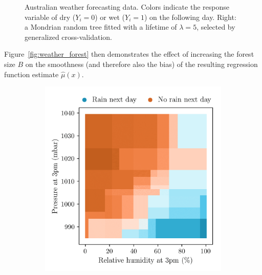 \begin{figure}[ht]
\begin{subfigure}{0.49\textwidth}
  \end{subfigure}
  \caption{Australian weather forecasting data. Colors indicate the response
    variable of dry ($Y_i = 0$) or wet ($Y_i = 1$) on the following day.
    Right: a Mondrian random tree fitted with a lifetime of $\lambda = 5$,
  selected by generalized cross-validation.}
  \label{fig:weather_data}
\end{figure}

Figure~\ref{fig:weather_forest} then
demonstrates the effect of increasing the forest size $B$ on the smoothness
(and therefore also the bias) of the resulting regression function estimate
$\hat \mu(x)$.

\begin{figure}[ht]
  \centering
  \begin{subfigure}{0.49\textwidth}
    \centering
    \includegraphics[scale=0.64]{graphics/weather_forest_2.png}%
  \end{subfigure}
  \begin{subfigure}{0.49\textwidth}
    \centering

\end{subfigure}
\end{figure}
